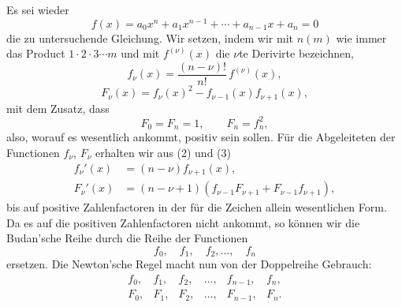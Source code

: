 \documentclass[11pt]{article}
\begin{document}
Es sei wieder
\begin{equation}
        f(x)=a_0x^n+a_1x^{n-1}+\cdots+a_{n-1}x+a_n=0
\tag{1}
\end{equation}
die zu untersuchende Gleichung. Wir setzen, indem wir mit $n(m)$ wie immer das Product $1\cdot 2\cdot3\cdots m$ und mit $f^{(\nu)}(x)$ die $\nu$te Derivirte bezeichnen,
\begin{equation}
        f_\nu(x)=\frac{(n-\nu)!}{n!}\,f^{(\nu)}(x),
\tag{2}
\end{equation}
\begin{equation}
        F_\nu(x)=f_\nu(x)^2-f_{\nu-1}(x)f_{\nu+1}(x),
\tag{3}
\end{equation}
mit dem Zusatz, dass
\begin{equation}
        F_0=F_n=1,\qquad F_n=f_n^2,
\tag{4}
\end{equation}
also, worauf es wesentlich ankommt, positiv sein sollen. Für die Abgeleiteten der Functionen $f_\nu$, $F_\nu$ erhalten wir aus (2) und (3)
\begin{align}
        f_\nu'(x)&=(n-\nu)f_{\nu+1}(x),\tag{5}\\
        F_\nu'(x)&=(n-\nu+1)(f_{\nu-1}F_{\nu+1}+F_{\nu-1}f_{\nu+1}),
\tag{6}
\end{align}
bis auf positive Zahlenfactoren in der für die Zeichen allein wesentlichen Form. Da es auf die positiven Zahlenfactoren nicht ankommt, so können wir die Budan'sche Reihe durch die Reihe der Functionen
\[
        f_0,\quad f_1,\quad f_2,\ldots,\quad f_n
\]
ersetzen. Die Newton'sche Regel macht nun von der Doppelreihe Gebrauch:
\begin{equation}
\begin{array}{cccccc}
f_0,&f_1,&f_2,&\ldots,&f_{n-1},&f_n,\\
F_0,&F_1,&F_2,&\ldots,&F_{n-1},&F_n.
\end{array}
\tag{7}
\end{equation}
\end{document}
